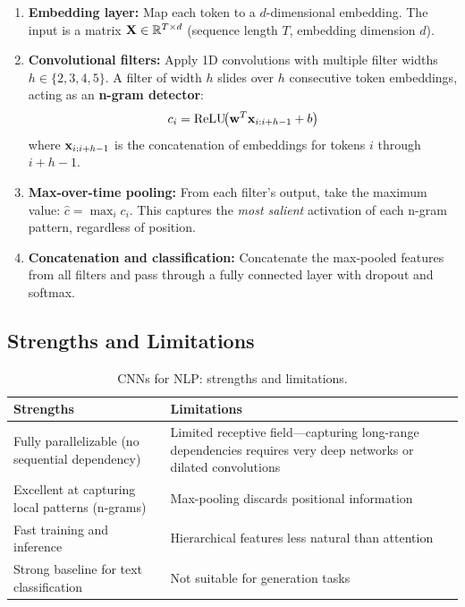 \begin{enumerate}[leftmargin=*]
\item \textbf{Embedding layer:} Map each token to a $d$-dimensional
  embedding.  The input is a matrix $\mathbf{X} \in \mathbb{R}^{T \times d}$ (sequence
  length $T$, embedding dimension $d$).

\item \textbf{Convolutional filters:} Apply 1D convolutions with multiple
  filter widths $h \in \{2, 3, 4, 5\}$.  A filter of width $h$ slides
  over $h$ consecutive token embeddings, acting as an \textbf{n-gram
  detector}:
  \begin{equation}
  c_i = \operatorname{ReLU}\!\bigl(\mathbf{w}^T \mathbf{x}_{i:i+h-1} + b\bigr)
  \end{equation}
  where $\mathbf{x}_{i:i+h-1}$ is the concatenation of embeddings for tokens $i$
  through $i+h-1$.

\item \textbf{Max-over-time pooling:} From each filter's output, take the
  maximum value: $\hat{c} = \max_i c_i$.  This captures the
  \emph{most salient} activation of each n-gram pattern, regardless of
  position.

\item \textbf{Concatenation and classification:} Concatenate the
  max-pooled features from all filters and pass through a fully connected
  layer with dropout and softmax.
\end{enumerate}

\subsection{Strengths and Limitations}

\begin{table}[H]
\centering
\caption{CNNs for NLP: strengths and limitations.}
\begin{tabularx}{\textwidth}{lX}
\toprule
\textbf{Strengths} & \textbf{Limitations} \\
\midrule
Fully parallelizable (no sequential dependency) &
  Limited receptive field---capturing long-range dependencies requires
  very deep networks or dilated convolutions \\
Excellent at capturing local patterns (n-grams) &
  Max-pooling discards positional information \\
Fast training and inference &
  Hierarchical features less natural than attention \\
Strong baseline for text classification &
  Not suitable for generation tasks \\
\bottomrule
\end{tabularx}
\end{table}

